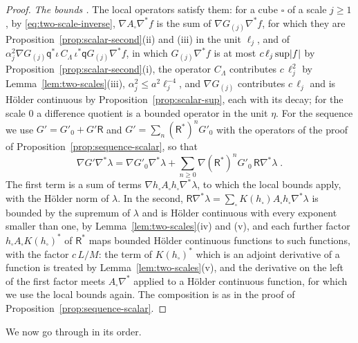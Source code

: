 \documentclass[11pt]{preprint}
\DeclarePairedDelimiter{\abs}{\lvert}{\rvert}
\numberwithin{equation}{section}
\theoremstyle{definition}
\theoremstyle{remark}
\theoremstyle{plain}
\begin{document}
\begin{proof}
\emph{The bounds \cite[(3.44), (3.45)]{BalabanPBG}.} The local operators satisfy them: for a cube $\square$ of a scale $j \geq 1$, by \eqref{eq:two-scale-inverse}, $\nabla A_\square\nabla^*f$ is the sum of $\nabla G_{(j)}\nabla^*f$, for which they are Proposition~\ref{prop:scalar-second}(ii) and (iii) in the unit $\ell_j$, and of $\alpha_j^2\nabla G_{(j)}\mathsf q^*\iota\,C_\Lambda\,\iota^*\mathsf qG_{(j)}\nabla^*f$, in which $G_{(j)}\nabla^*f$ is at most $c\,\ell_j\sup\abs f$ by Proposition~\ref{prop:scalar-second}(i), the operator $C_\Lambda$ contributes $c\,\ell_j^2$ by Lemma~\ref{lem:two-scales}(iii), $\alpha_j^2 \leq a^2\ell_j^{-4}$, and $\nabla G_{(j)}$ contributes $c\,\ell_j$ and is H\"older continuous by Proposition~\ref{prop:scalar-sup}, each with its decay; for the scale $0$ a difference quotient is a bounded operator in the unit $\eta$. For the sequence we use $G' = G'_0 + G'\mathsf R$ and $G' = \sum_n(\mathsf R^*)^nG'_0$ with the operators of the proof of Proposition~\ref{prop:sequence-scalar}, so that
\begin{equation}\label{eq:scalar-double}
    \nabla G'\nabla^*\lambda = \nabla G'_0\nabla^*\lambda + \sum_{n \geq 0}\nabla(\mathsf R^*)^nG'_0\,\mathsf R\nabla^*\lambda\;.
\end{equation}
The first term is a sum of terms $\nabla h_\square A_\square h_\square\nabla^*\lambda$, to which the local bounds apply, with the H\"older norm of $\lambda$. In the second, $\mathsf R\nabla^*\lambda = \sum_\square K(h_\square)A_\square h_\square\nabla^*\lambda$ is bounded by the supremum of $\lambda$ and is H\"older continuous with every exponent smaller than one, by Lemma~\ref{lem:two-scales}(iv) and (v), and each further factor $h_\square A_\square K(h_\square)^*$ of $\mathsf R^*$ maps bounded H\"older continuous functions to such functions, with the factor $c\,L/M$: the term of $K(h_\square)^*$ which is an adjoint derivative of a function is treated by Lemma~\ref{lem:two-scales}(v), and the derivative on the left of the first factor meets $A_\square\nabla^*$ applied to a H\"older continuous function, for which we use the local bounds again. The composition is as in the proof of Proposition~\ref{prop:sequence-scalar}.
\end{proof}

We now go through \cite{BalabanPBG} in its order.
\end{document}
